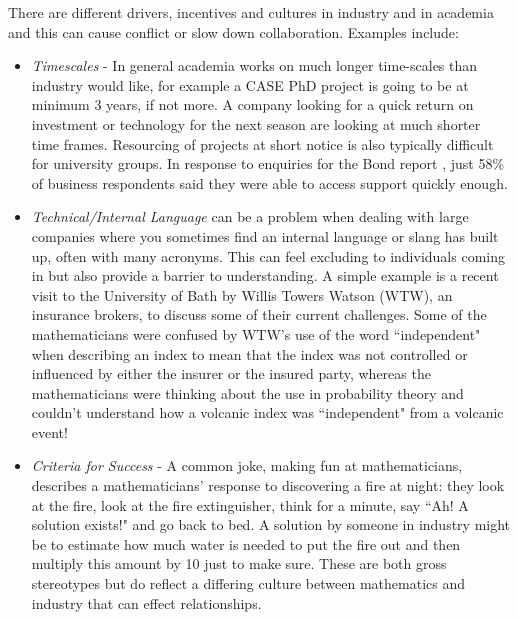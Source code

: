 \documentclass[11pt]{article} %
\begin{document}
	There are different drivers, incentives and cultures in industry and in academia and this can cause conflict or slow down collaboration. Examples include: 
	\begin{itemize}
		\item \textit{Timescales} - In general academia works on much longer time-scales than industry would like, for example a CASE PhD project is going to be at minimum 3 years, if not more. A company looking for a quick return on investment or technology for the next season are looking at much shorter time frames. Resourcing of projects at short notice is also typically difficult for university groups. In response to enquiries for the Bond report \cite{Bond}, just 58\% of business respondents said they were able to access support quickly enough. 
		\item \textit{Technical/Internal Language} can be a problem when dealing with large companies where you sometimes find an internal language or slang has built up, often with many acronyms.  This can feel excluding to individuals coming in but also provide a barrier to understanding. A simple example is a recent visit to the University of Bath by Willis Towers Watson (WTW), an insurance brokers, to discuss some of their current challenges. Some of the mathematicians were confused by WTW's use of the word ``independent" when describing an index to mean that the index was not controlled or influenced by either the insurer or the insured party, whereas the mathematicians were thinking about the use in probability theory and couldn't understand how a volcanic index was ``independent" from a volcanic event!
		\item \textit{Criteria for Success} - A common joke, making fun at mathematicians, describes  a mathematicians' response to discovering a fire at night: they look at the fire, look at the fire extinguisher, think for a minute, say ``Ah! A solution exists!" and go back to bed. A solution by someone in industry might be to estimate how much water is needed to put the fire out and then multiply this amount by 10 just to make sure. These are both gross stereotypes but do reflect a differing culture between mathematics and industry that can effect relationships.		
	\end{itemize}

	
\end{document}
